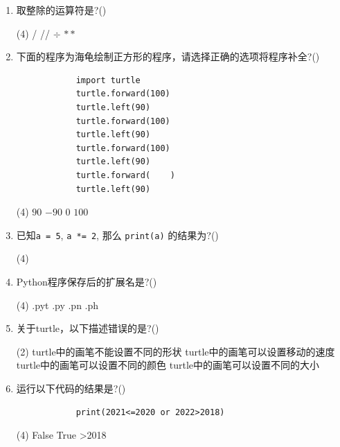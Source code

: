 \documentclass[11pt]{ctexart}
\begin{document}
    \begin{enumerate}
        \item 取整除的运算符是?(\qquad)
        \begin{tasks}(4)
            \task /
            \task //
            \task $\div$
            \task $**$
        \end{tasks}
    
        \item 下面的程序为海龟绘制正方形的程序，请选择正确的选项将程序补全?(\qquad)
        \begin{lstlisting}
            import turtle
            turtle.forward(100)
            turtle.left(90)
            turtle.forward(100)
            turtle.left(90)
            turtle.forward(100)
            turtle.left(90)
            turtle.forward(    )
            turtle.left(90)
        \end{lstlisting}
        \begin{tasks}(4)
            \task $90$
            \task $-90$
            \task $0$
            \task $100$
        \end{tasks}

        \item 已知\lstinline{a = 5}, \lstinline{a *= 2}, 那么 \lstinline!print(a)! 的结果为?(\qquad)
        \begin{tasks}(4)
        \end{tasks}
    
        \item Python程序保存后的扩展名是?(\qquad)
        \begin{tasks}(4)
            \task .pyt
            \task .py
            \task .pn
            \task .ph
        \end{tasks}

        \item 关于turtle，以下描述错误的是?(\qquad)
        \begin{tasks}(2)
            \task turtle中的画笔不能设置不同的形状
            \task turtle中的画笔可以设置移动的速度
            \task turtle中的画笔可以设置不同的颜色
            \task turtle中的画笔可以设置不同的大小
        \end{tasks}

        \item 运行以下代码的结果是?(\qquad)
        \begin{lstlisting}
            print(2021<=2020 or 2022>2018)
        \end{lstlisting}
        \begin{tasks}(4)
            \task False
            \task True
            >2018
        \end{tasks}


\end{enumerate}
\end{document}
